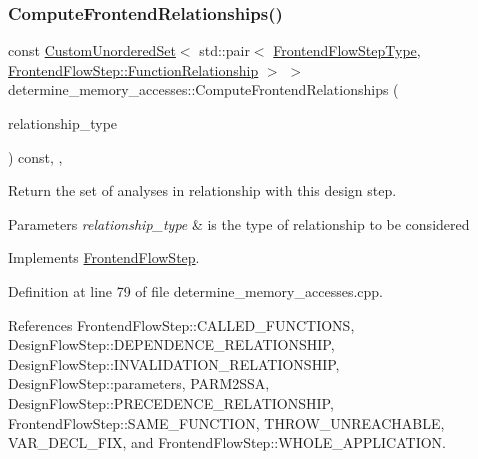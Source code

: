 \subsubsection{\texorpdfstring{Compute\+Frontend\+Relationships()}{ComputeFrontendRelationships()}}
{\footnotesize\ttfamily const \hyperlink{classCustomUnorderedSet}{Custom\+Unordered\+Set}$<$ std\+::pair$<$ \hyperlink{frontend__flow__step_8hpp_afeb3716c693d2b2e4ed3e6d04c3b63bb}{Frontend\+Flow\+Step\+Type}, \hyperlink{classFrontendFlowStep_af7cf30f2023e5b99e637dc2058289ab0}{Frontend\+Flow\+Step\+::\+Function\+Relationship} $>$ $>$ determine\+\_\+memory\+\_\+accesses\+::\+Compute\+Frontend\+Relationships (\begin{DoxyParamCaption}\item[{const \hyperlink{classDesignFlowStep_a723a3baf19ff2ceb77bc13e099d0b1b7}{Design\+Flow\+Step\+::\+Relationship\+Type}}]{relationship\+\_\+type }\end{DoxyParamCaption}) const\hspace{0.3cm}{\ttfamily [override]}, {\ttfamily [private]}, {\ttfamily [virtual]}}



Return the set of analyses in relationship with this design step. 


\begin{DoxyParams}{Parameters}
{\em relationship\+\_\+type} & is the type of relationship to be considered \\
\hline
\end{DoxyParams}


Implements \hyperlink{classFrontendFlowStep_abeaff70b59734e462d347ed343dd700d}{Frontend\+Flow\+Step}.



Definition at line 79 of file determine\+\_\+memory\+\_\+accesses.\+cpp.



References Frontend\+Flow\+Step\+::\+C\+A\+L\+L\+E\+D\+\_\+\+F\+U\+N\+C\+T\+I\+O\+NS, Design\+Flow\+Step\+::\+D\+E\+P\+E\+N\+D\+E\+N\+C\+E\+\_\+\+R\+E\+L\+A\+T\+I\+O\+N\+S\+H\+IP, Design\+Flow\+Step\+::\+I\+N\+V\+A\+L\+I\+D\+A\+T\+I\+O\+N\+\_\+\+R\+E\+L\+A\+T\+I\+O\+N\+S\+H\+IP, Design\+Flow\+Step\+::parameters, P\+A\+R\+M2\+S\+SA, Design\+Flow\+Step\+::\+P\+R\+E\+C\+E\+D\+E\+N\+C\+E\+\_\+\+R\+E\+L\+A\+T\+I\+O\+N\+S\+H\+IP, Frontend\+Flow\+Step\+::\+S\+A\+M\+E\+\_\+\+F\+U\+N\+C\+T\+I\+ON, T\+H\+R\+O\+W\+\_\+\+U\+N\+R\+E\+A\+C\+H\+A\+B\+LE, V\+A\+R\+\_\+\+D\+E\+C\+L\+\_\+\+F\+IX, and Frontend\+Flow\+Step\+::\+W\+H\+O\+L\+E\+\_\+\+A\+P\+P\+L\+I\+C\+A\+T\+I\+ON.

